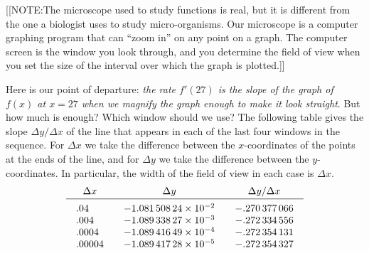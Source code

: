 [[NOTE:The microscope used to study functions is real, but it is
  different from the one a biologist uses to study micro-organisms.
  Our microscope is a computer graphing program that can ``zoom in''
  on any point on a graph.  The computer screen is the window you look
  through, and you determine the field of view when you set the size
  of the interval over which the graph is plotted.]]

Here is our point of departure: \emph{the rate $f'(27)$ is the slope
  of the graph of $f(x)$ at $x = 27$ when we magnify the graph enough
  to make it look straight}.  But how much is enough?  Which window
should we use?  The following table gives the slope $\Delta y/\Delta
x$ of the line that appears in each of the last four windows in the
sequence.  For $\Delta x$ we take the difference between the
$x$-coordinates of the points at the ends of the line, and for $\Delta
y$ we take the difference between the $y$-coordinates.  In particular,
the width of the field of view in each case is $\Delta x$.
\[
\begin{array}{ccc}\label{`zoom'}
	\Delta x & \Delta y & \Delta y/\Delta x
		\\[1pt] \hline
	\rule{0pt}{1pt} &  &  \\[-8pt]
	\begin{array}{l} .04 \\ .004 \\ .0004 \\ .00004 
	\end{array}
	&
	\begin{array}{c}
		-1.081\,508\,24 \times 10^{-2} \\
		-1.089\,338\,27 \times 10^{-3} \\
		-1.089\,416\,49 \times 10^{-4} \\
		-1.089\,417\,28 \times 10^{-5}
	\end{array}
	&
	\begin{array}{c} 
		-.270\,377\,066  \\
		-.272\,334\,556  \\
		-.272\,354\,131  \\
		-.272\,354\,327    
	\end{array}
\end{array}
\]


